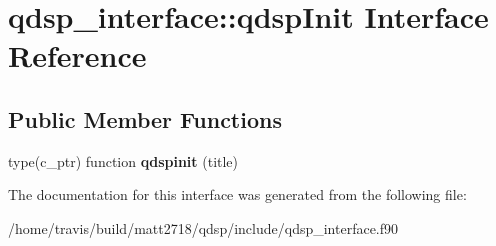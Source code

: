 \hypertarget{interfaceqdsp__interface_1_1qdspInit}{\section{qdsp\-\_\-interface\-:\-:qdsp\-Init Interface Reference}
\label{interfaceqdsp__interface_1_1qdspInit}
}
\subsection*{Public Member Functions}
\begin{DoxyCompactItemize}
\item 
\hypertarget{interfaceqdsp__interface_1_1qdspInit_a37ba9d888e4d59ebdfcd8a046cdf542f}{type(c\-\_\-ptr) function {\bfseries qdspinit} (title)}\label{interfaceqdsp__interface_1_1qdspInit_a37ba9d888e4d59ebdfcd8a046cdf542f}

\end{DoxyCompactItemize}


The documentation for this interface was generated from the following file\-:\begin{DoxyCompactItemize}
\item 
/home/travis/build/matt2718/qdsp/include/qdsp\-\_\-interface.\-f90\end{DoxyCompactItemize}
